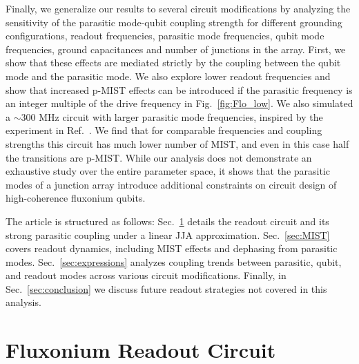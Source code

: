 \documentclass[%
reprint,
superscriptaddress,
 amsmath,amssymb,
 aps,
 prx,
longbibliography,
floatfix,
]{revtex4-2}
\begin{document}
Finally, we generalize our results to several circuit modifications by analyzing the sensitivity of the parasitic mode-qubit coupling strength for different grounding configurations, readout frequencies, parasitic mode frequencies, qubit mode frequencies, ground capacitances and number of junctions in the array. First, we show that these effects are mediated strictly by the coupling between the qubit mode and the parasitic mode. We also explore lower readout frequencies and show that increased p-MIST effects can be introduced if the parasitic frequency is an integer multiple of the drive frequency in Fig.~\ref{fig:Flo_low}. We also simulated a $\sim 300$ MHz circuit with larger parasitic mode frequencies, inspired by the experiment in Ref.~\cite{ding_high-fidelity_2023}. We find that for comparable frequencies and coupling strengths this circuit has much lower number of MIST, and even in this case half the transitions are p-MIST. While our analysis does not demonstrate an exhaustive study over the entire parameter space, it shows that the parasitic modes of a junction array introduce additional constraints on circuit design of high-coherence fluxonium qubits.


The article is structured as follows: Sec.~\ref{sec:Fluxonium} details the readout circuit and its strong parasitic coupling under a linear JJA approximation. Sec.~\ref{sec:MIST} covers readout dynamics, including MIST effects and dephasing from parasitic modes. Sec.~\ref{sec:expressions} analyzes coupling trends between parasitic, qubit, and readout modes across various circuit modifications. Finally, in Sec.~\ref{sec:conclusion} we discuss future readout strategies not covered in this analysis. %
\section{Fluxonium Readout Circuit}\label{sec:Fluxonium}
\end{document}
